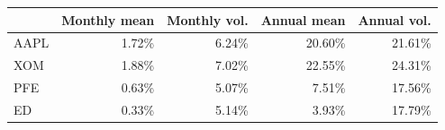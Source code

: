 \begin{tabular}{lrrrr}
\toprule
 & Monthly mean & Monthly vol. & Annual mean & Annual vol. \\
\midrule
AAPL & 1.72\% & 6.24\% & 20.60\% & 21.61\% \\
XOM & 1.88\% & 7.02\% & 22.55\% & 24.31\% \\
PFE & 0.63\% & 5.07\% & 7.51\% & 17.56\% \\
ED & 0.33\% & 5.14\% & 3.93\% & 17.79\% \\
\bottomrule
\end{tabular}
